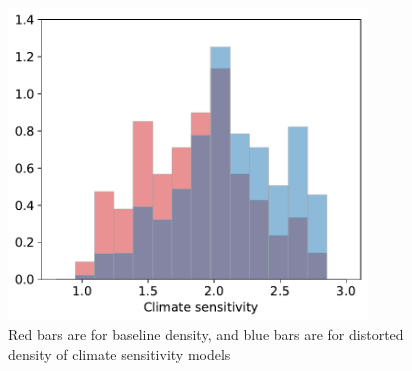 \documentclass[11pt]{article}
\begin{document}
\begin{figure}[H]
	\centering
	\includegraphics[width=0.85\textwidth]{../figures/20damage/worstcase.pdf}
		\caption{Red bars are for baseline density, and blue bars are for distorted density of climate sensitivity models}
\end{figure}
\end{document}
